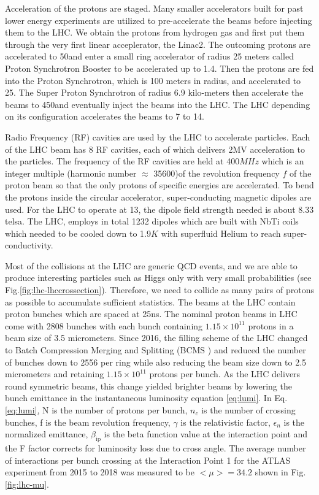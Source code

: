Acceleration of the protons are staged. Many smaller accelerators built for past lower energy experiments are utilized to pre-accelerate the beams before injecting them to the LHC. We obtain the protons from hydrogen gas and first put them through the very first linear acceplerator, the Linac2. The outcoming protons are accelerated to 50\mev and enter a small ring accelerator of radius 25 meters called Proton Synchrotron Booster to be accelerated up to 1.4\gev. Then the protons are fed into the Proton Synchrotron, which is 100 meters in radius, and accelerated to 25\gev. The Super Proton Synchrotron of radius 6.9 kilo-meters then accelerate the beams to 450\gev and eventually inject the beams into the LHC. The LHC depending on its configuration accelerates the beams to 7 to 14\tev.

Radio Frequency (RF) cavities are used by the LHC to accelerate particles. Each of the LHC beam has 8 RF cavities, each of which delivers 2MV acceleration to the particles. The frequency of the RF cavities are held at 400$MHz$ which is an integer multiple (harmonic number $\approx$ 35600)of the revolution frequency $f$ of the proton beam so that the only protons of specific energies are accelerated. To bend the protons inside the circular accelerator, super-conducting magnetic dipoles are used. For the LHC to operate at 13\tev, the dipole field strength needed is about 8.33 telsa. The LHC, employs in total 1232 dipoles which are built with NbTi coils which needed to be cooled down to 1.9$K$ with superfluid Helium to reach super-conductivity.

Most of the collisions at the LHC are generic QCD events, and we are able to produce interesting particles such as Higgs only with very small probabilities (see Fig.\ref{fig:lhc-lhccrossection}). Therefore, we need to collide as many pairs of protons as possible to accumulate sufficient statistics. The beams at the LHC contain proton bunches which are spaced at 25ns. The nominal proton beams in LHC come with 2808 bunches with each bunch containing $1.15\times 10^{11}$ protons in a beam size of 3.5 micrometers. Since 2016, the filling scheme of the LHC changed to Batch Compression Merging and Splitting (BCMS \cite{BCMS}) and reduced the number of bunches down to 2556 per ring while also reducing the beam size down to 2.5 micrometers and retaining $1.15\times 10^{11}$ protons per bunch. As the LHC delivers round symmetric beams, this change yielded brighter beams by lowering the bunch emittance in the instantaneous luminosity equation \ref{eq:lumi}. In Eq.\ref{eq:lumi}, N is the number of protons per bunch, $n_c$ is the number of crossing bunches, f is the beam revolution frequency, $\gamma$ is the relativistic factor, $\epsilon_n$ is the normalized emittance, $\beta_{\text{ip}}$ is the beta function value at the interaction point and the F factor corrects for luminosity loss due to cross angle. The average number of interactions per bunch crossing at the Interaction Point 1 for the ATLAS experiment from 2015 to 2018 was measured to be $<\mu>=34.2$ shown in Fig.\ref{fig:lhc-mu}. 


